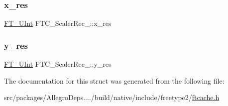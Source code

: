 \subsubsection{\texorpdfstring{x\+\_\+res}{x\_res}}
{\footnotesize\ttfamily \hyperlink{fttypes_8h_abcb8db4dbf35d2b55a9e8c7b0926dc52}{F\+T\+\_\+\+U\+Int} F\+T\+C\+\_\+\+Scaler\+Rec\+\_\+\+::x\+\_\+res}

\mbox{\label{struct_f_t_c___scaler_rec___accb53c7a9aeebb41c05f48d14d3dfe71}} 
\subsubsection{\texorpdfstring{y\+\_\+res}{y\_res}}
{\footnotesize\ttfamily \hyperlink{fttypes_8h_abcb8db4dbf35d2b55a9e8c7b0926dc52}{F\+T\+\_\+\+U\+Int} F\+T\+C\+\_\+\+Scaler\+Rec\+\_\+\+::y\+\_\+res}



The documentation for this struct was generated from the following file\+:\begin{DoxyCompactItemize}
\item 
src/packages/\+Allegro\+Deps..../build/native/include/freetype2/\hyperlink{ftcache_8h}{ftcache.\+h}\end{DoxyCompactItemize}
